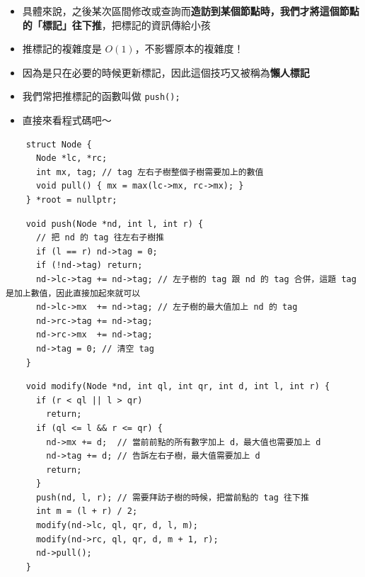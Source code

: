 \documentclass[standalone]{beamer}
\begin{document}
\begin{frame}[fragile]{}
  \begin{itemize}
    \item 具體來說，之後某次區間修改或查詢而\textbf{造訪到某個節點時，我們才將這個節點的「標記」往下推}，把標記的資訊傳給小孩
    \item 推標記的複雜度是 $O(1)$，不影響原本的複雜度！
    \item 因為是只在必要的時候更新標記，因此這個技巧又被稱為\textbf{懶人標記}
    \item 我們常把推標記的函數叫做 \texttt{push();}
    \item 直接來看程式碼吧～
  \end{itemize}
\end{frame}

\begin{frame}[fragile]{}
  \begin{verbatim}
    struct Node {
      Node *lc, *rc;
      int mx, tag; // tag 左右子樹整個子樹需要加上的數值
      void pull() { mx = max(lc->mx, rc->mx); }
    } *root = nullptr;
  \end{verbatim}
\end{frame}

\begin{frame}[fragile]{}
  \begin{verbatim}
    void push(Node *nd, int l, int r) {
      // 把 nd 的 tag 往左右子樹推
      if (l == r) nd->tag = 0;
      if (!nd->tag) return;
      nd->lc->tag += nd->tag; // 左子樹的 tag 跟 nd 的 tag 合併，這題 tag 是加上數值，因此直接加起來就可以
      nd->lc->mx  += nd->tag; // 左子樹的最大值加上 nd 的 tag
      nd->rc->tag += nd->tag;
      nd->rc->mx  += nd->tag;
      nd->tag = 0; // 清空 tag
    }
  \end{verbatim}
\end{frame}

\begin{frame}[fragile]{}
  \begin{verbatim}
    void modify(Node *nd, int ql, int qr, int d, int l, int r) {
      if (r < ql || l > qr)
        return;
      if (ql <= l && r <= qr) {
        nd->mx += d;  // 當前前點的所有數字加上 d，最大值也需要加上 d
        nd->tag += d; // 告訴左右子樹，最大值需要加上 d
        return;
      }
      push(nd, l, r); // 需要拜訪子樹的時候，把當前點的 tag 往下推
      int m = (l + r) / 2;
      modify(nd->lc, ql, qr, d, l, m);
      modify(nd->rc, ql, qr, d, m + 1, r);
      nd->pull();
    }
  \end{verbatim}
\end{frame}
\end{document}
